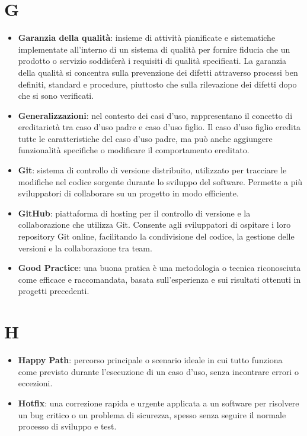 \documentclass[a4paper,12pt]{article}
\begin{document}
\section{G}
\begin{itemize}
    \item \textbf{Garanzia della qualità}: insieme di attività pianificate e sistematiche implementate all'interno di un sistema di qualità per fornire fiducia che un prodotto o servizio soddisferà i requisiti di qualità specificati. La garanzia della qualità si concentra sulla prevenzione dei difetti attraverso processi ben definiti, standard e procedure, piuttosto che sulla rilevazione dei difetti dopo che si sono verificati.
    \item \textbf{Generalizzazioni}: nel contesto dei casi d'uso, rappresentano il concetto di ereditarietà tra caso d'uso padre e caso d'uso figlio. Il caso d'uso figlio eredita tutte le caratteristiche del caso d'uso padre, ma può anche aggiungere funzionalità specifiche o modificare il comportamento ereditato.
    \item \textbf{Git}: sistema di controllo di versione distribuito, utilizzato per tracciare le modifiche nel codice sorgente durante lo sviluppo del software. Permette a più sviluppatori di collaborare su un progetto in modo efficiente.
    \item \textbf{GitHub}: piattaforma di hosting per il controllo di versione e la collaborazione che utilizza Git. Consente agli sviluppatori di ospitare i loro repository Git online, facilitando la condivisione del codice, la gestione delle versioni e la collaborazione tra team.
    \item \textbf{Good Practice}: una buona pratica è una metodologia o tecnica riconosciuta come efficace e raccomandata, basata sull'esperienza e sui risultati ottenuti in progetti precedenti.
\end{itemize}
\section{H}
\begin{itemize}
    \item \textbf{Happy Path}: percorso principale o scenario ideale in cui tutto funziona come previsto durante l'esecuzione di un caso d'uso, senza incontrare errori o eccezioni.
    \item \textbf{Hotfix}: una correzione rapida e urgente applicata a un software per risolvere un bug critico o un problema di sicurezza, spesso senza seguire il normale processo di sviluppo e test.
\end{itemize}
\end{document}
